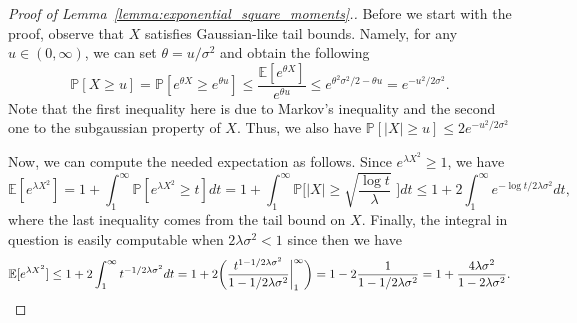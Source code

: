 \documentclass[11pt]{amsart}
\theoremstyle{definition}
\def\bE{\mathbb{E}}
\def\Pb{\mathbb{P}}
\begin{document}
\begin{proof}[Proof of Lemma~\ref{lemma:exponential_square_moments}.]
Before we start with the proof, observe that $X$ satisfies Gaussian-like tail bounds. Namely, for any $u\in (0, \infty)$, we can set $\theta=u/\sigma^2$ and obtain the following
{\smaller[0.3]
\[\Pb[X\geq u]=\Pb[e^{\theta X}\geq e^{\theta u}]\leq \frac{\bE[e^{\theta X}]}{e^{\theta u}}\leq e^{\theta^2 \sigma^2/2-\theta u}= e^{-u^2/2\sigma^2}.\]
}
Note that the first inequality here is due to Markov's inequality and the second one to the subgaussian property of $X$. Thus, we also have $\Pb[|X|\geq u]\leq 2e^{-u^2/2\sigma^2}$

Now, we can compute the needed expectation as follows. Since $e^{\lambda X^2}\geq 1$, we have
{\smaller[0.3]
\[\bE[e^{\lambda X^2}]=1+\int_1^\infty \Pb[e^{\lambda X^2}\geq t]dt=1+\int_1^\infty \Pb\bigg[|X|\geq \sqrt{\frac{\log t}{\lambda}}\,\,\bigg]dt\leq 1+2\int_{1}^\infty e^{-\log t/2\lambda \sigma^2}dt,\]
}
where the last inequality comes from the tail bound on $X$. Finally, the integral in question is easily computable when $2\lambda\sigma^2<1$ since then we have
{\smaller[0.3]
\[\bE[e^{\lambda X^2}]\leq 1+2\int_{1}^\infty t^{-1/2\lambda \sigma^2}dt=1+2\bigg(\frac{t^{1-1/2\lambda\sigma^2}}{1-1/2\lambda\sigma^2}\bigg|_{1}^\infty\bigg)=1-2\frac{1}{1-1/2\lambda\sigma^2}=1+\frac{4\lambda \sigma^2}{1-2\lambda\sigma^2}.\qedhere\]
}
\end{proof}
\end{document}
